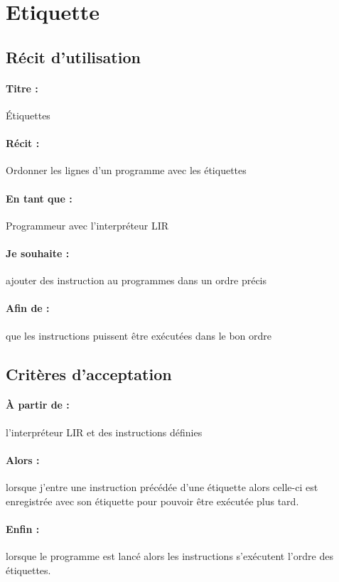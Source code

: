 \section{Etiquette}
    \subsection*{Récit d'utilisation}

    \paragraph{Titre : } Étiquettes
    \paragraph{Récit : } Ordonner les lignes d'un programme avec les étiquettes
    \paragraph{En tant que : } Programmeur avec l'interpréteur LIR
    \paragraph{Je souhaite : } ajouter des instruction au programmes dans un ordre précis
    \paragraph{Afin de : } que les instructions puissent être exécutées dans le bon ordre
    \newpage

    \subsection*{Critères d'acceptation}

    \paragraph{À partir de : } l'interpréteur LIR et des instructions définies
    \paragraph{Alors : } lorsque j'entre une instruction précédée d'une étiquette alors celle-ci est enregistrée avec son étiquette pour pouvoir être exécutée plus tard.
    \paragraph{Enfin : } lorsque le programme est lancé alors les instructions s'exécutent l'ordre des étiquettes.
